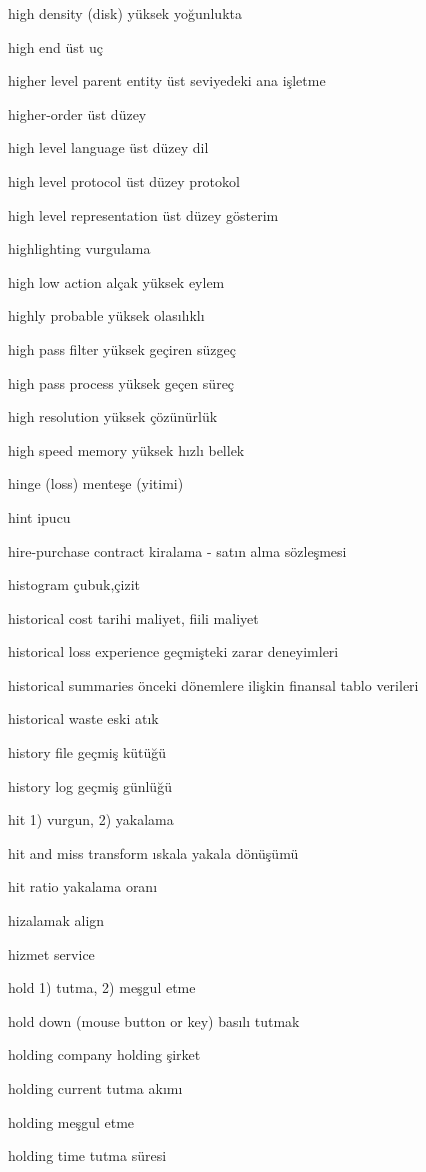\documentclass[12pt,fleqn]{article}\usepackage{../../common}
\begin{document}
high density (disk) yüksek yoğunlukta

high end üst uç

higher level parent entity üst seviyedeki ana işletme

higher-order üst düzey

high level language üst düzey dil

high level protocol üst düzey protokol

high level representation üst düzey gösterim

highlighting vurgulama

high low action alçak yüksek eylem

highly probable yüksek olasılıklı

high pass filter yüksek geçiren süzgeç

high pass process yüksek geçen süreç

high resolution yüksek çözünürlük

high speed memory yüksek hızlı bellek

hinge (loss) menteşe (yitimi)

hint ipucu

hire-purchase contract kiralama - satın alma sözleşmesi

histogram çubuk,çizit

historical cost tarihi maliyet, fiili maliyet

historical loss experience geçmişteki zarar deneyimleri

historical summaries önceki dönemlere ilişkin finansal tablo verileri

historical waste eski atık

history file geçmiş kütüğü

history log geçmiş günlüğü

hit 1) vurgun, 2) yakalama

hit and miss transform ıskala yakala dönüşümü

hit ratio yakalama oranı

hizalamak align

hizmet service

hold 1) tutma, 2) meşgul etme

hold down (mouse button or key) basılı tutmak

holding company holding şirket

holding current tutma akımı

holding meşgul etme

holding time tutma süresi
\end{document}
